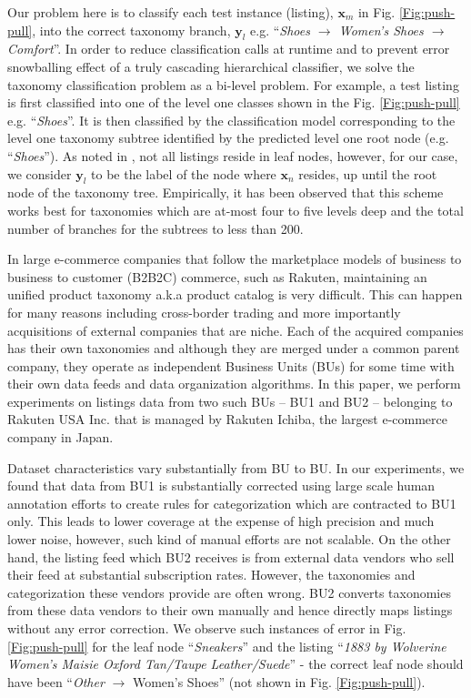 Our problem here is to classify each test instance (listing), $\bm{x}_m$ in Fig. \ref{Fig:push-pull}, into the correct taxonomy branch, $\bm{y}_l$ e.g. ``\textit{Shoes $\rightarrow$ Women's Shoes $\rightarrow$ Comfort}''.
In order to reduce classification calls at runtime and to prevent error snowballing effect of a truly cascading hierarchical classifier, we solve the taxonomy classification problem as a bi-level problem.
For example, a test listing is first classified into one of the level one classes shown in the Fig. \ref{Fig:push-pull} e.g. ``\textit{Shoes}''.
It is then classified by the classification model corresponding to the level one taxonomy subtree identified by the predicted level one root node (e.g. ``\textit{Shoes}'').
As noted in \cite{Julian15}, not all listings reside in leaf nodes, however, for our case, we consider $\bm{y}_l$ to be the label of the node where $\bm{x}_n$ resides, up until the root node of the taxonomy tree.
Empirically, it has been observed that this scheme works best for taxonomies which are at-most four to five levels deep and the total number of branches for the subtrees to less than 200. 

In large e-commerce companies that follow the marketplace models of business to business to customer (B2B2C) commerce, such as Rakuten, maintaining an unified product taxonomy a.k.a product catalog is very difficult. 
This can happen for many reasons including cross-border trading and more importantly acquisitions of external companies that are niche.
Each of the acquired companies has their own taxonomies and although they are merged under a common parent company, they operate as independent Business Units (BUs)  for some time with their own data feeds and data organization algorithms.
In this paper, we perform experiments on listings data from two such BUs -- BU1 and BU2 -- belonging to Rakuten USA Inc.
that is managed by Rakuten Ichiba, the largest e-commerce company in Japan.

Dataset characteristics vary substantially from BU to BU.
In our experiments, we found that data from BU1 is substantially corrected using large scale human annotation efforts to create rules for categorization which are contracted to BU1 only.
This leads to lower coverage at the expense of high precision and much lower noise, however, such kind of manual efforts are not scalable.
On the other hand, the listing feed which BU2 receives is from external data vendors who sell their feed at substantial subscription rates. 
However, the taxonomies and categorization these vendors provide are often wrong.
BU2 converts taxonomies from these data vendors to their own manually and hence directly maps listings without any error correction.
We observe such instances of error in Fig. \ref{Fig:push-pull} for the leaf node ``\textit{Sneakers}'' and the listing ``\textit{1883 by Wolverine Women's Maisie Oxford Tan/Taupe Leather/Suede}'' - the correct leaf node should have been ``\textit{Other} $\rightarrow$ Women's Shoes'' (not shown in Fig. \ref{Fig:push-pull}).

